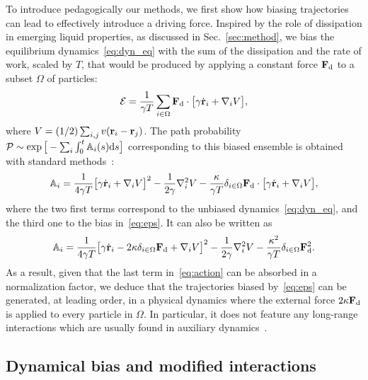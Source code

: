 \documentclass[superscriptaddress, twocolumn, prx, longbibliography, nofootinbib]{revtex4-1}
\begin{document}
To introduce pedagogically our methods, we first show how biasing trajectories can lead to effectively introduce a driving force. Inspired by the role of dissipation in emerging liquid properties, as discussed in Sec.~\ref{sec:method}, we bias the equilibrium dynamics~\eqref{eq:dyn_eq} with the sum of the dissipation and the rate of work, scaled by $T$, that would be produced by applying a constant force ${\bf F}_{\rm d}$ to a subset $\Omega$ of particles:
\begin{equation}\label{eq:eps}
	{\cal E} = \frac{1}{\gamma T}\sum_{i\in\Omega} {\bf F}_{\rm d}\cdot\big[ \gamma\dot{\bf r}_i + \nabla_i V \big] ,
\end{equation}
where $V=(1/2)\sum_{i,j}v({\bf r}_i-{\bf r}_j)$. The path probability ${\cal P}\sim\exp\big[-\sum_i\int_0^t{\mathbb A}_i(s){\rm d}s\big]$ corresponding to this biased ensemble is obtained with standard methods~\cite{Martin1973, Dominicis1975}:
\begin{equation}\label{eq:action_exp}
	{\mathbb A}_i = \frac{1}{4\gamma T} \big[\gamma\dot{\bf r}_i + \nabla_iV\big]^2 - \frac{1}{2\gamma} \nabla^2_iV - \frac{\kappa}{\gamma T} \delta_{i\in\Omega} {\bf F}_{\rm d} \cdot\big[ \gamma\dot{\bf r}_i + \nabla_i V \big] ,
\end{equation}
where the two first terms correspond to the unbiased dynamics~\eqref{eq:dyn_eq}, and the third one to the bias in~\eqref{eq:eps}. It can also be written as
\begin{equation}\label{eq:action}
	{\mathbb A}_i = \frac{1}{4\gamma T} \big[\gamma\dot{\bf r}_i - 2\kappa\delta_{i\in\Omega}{\bf F}_{\rm d} + \nabla_iV\big]^2 - \frac{1}{2\gamma} \nabla^2_iV - \frac{\kappa^2}{\gamma T}\delta_{i\in\Omega}{\bf F}_{\rm d}^2 .
\end{equation}
As a result, given that the last term in~\eqref{eq:action} can be absorbed in a normalization factor, we deduce that the trajectories biased by~\eqref{eq:eps} can be generated, at leading order, in a physical dynamics where the external force $2\kappa{\bf F}_{\rm d}$ is applied to every particle in $\Omega$. In particular, it does not feature any long-range interactions which are usually found in auxiliary dynamics~\cite{Jack2015}.




\subsection{Dynamical bias and modified interactions}\label{sec:doob}
\end{document}
